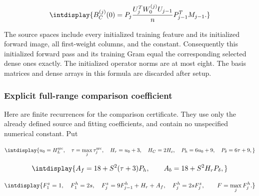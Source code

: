 \begingroup\renewcommand{\theHequation}{intdisplay.166}
\begin{equation}
\intdisplay{
B_C^{(j)}(0)=P_j\frac{U_j^TW_0^{(j)}U_{j-1}}nP_{j-1}^TM_{j-1}.
}
\label{int:eq-0065-harmonic-exact-initialization}
\end{equation}
\endgroup


The source spaces include every initialized training feature and its initialized forward image, all first-weight columns, and the constant. Consequently this initialized forward pass and its training Gram equal the corresponding selected dense ones exactly. The initialized operator norms are at most eight. The basis matrices and dense arrays in this formula are discarded after setup.


\subsubsection{Explicit full-range comparison coefficient}
\label{int:compact-explicit-comparison-certificate}
\label{int:harmonic-explicit-comparison-certificate}


Here are finite recurrences for the comparison certificate. They use only the already defined source and fitting coefficients, and contain no unspecified numerical constant. Put


\begingroup\renewcommand{\theHequation}{intdisplay.167}
\begin{equation*}
\intdisplay{
u_0=H_L^{\rm src},\quad \tau=\max_j\tau_j^{\rm src},\quad
H_r=u_0+3,\quad H_C=2H_c,\quad P_h=6u_0+9,\quad P_\delta=6\tau+9,
}
\end{equation*}
\endgroup

\begingroup\renewcommand{\theHequation}{intdisplay.168}
\begin{equation*}
\intdisplay{
A_f=18+S^2(\tau+3)P_h,\qquad A_b=18+S^2H_rP_\delta,
}
\end{equation*}
\endgroup

\begingroup\renewcommand{\theHequation}{intdisplay.169}
\begin{equation}
\intdisplay{
F_1^z=1,\quad F_1^h=2s,\quad
F_j^z=9F_{j-1}^h+H_r+A_f,\quad F_j^h=2sF_j^z,
\qquad F=\max_jF_j^h.
}
\label{int:eq-0066-harmonic-forward-subtraction-coefficients}
\end{equation}
\endgroup

